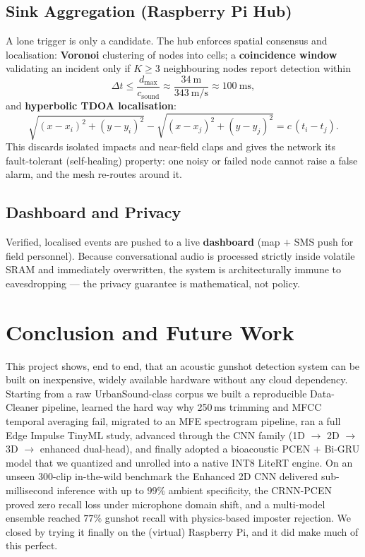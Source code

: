 \documentclass[conference]{IEEEtran}
\begin{document}
\subsection{Sink Aggregation (Raspberry Pi Hub)}
A lone trigger is only a candidate. The hub enforces spatial consensus and localisation:
\textbf{Voronoi} clustering of nodes into cells; a \textbf{coincidence window} validating an incident only if
$K \ge 3$ neighbouring nodes report detection within
\begin{equation}
    \Delta t \le \frac{d_{\max}}{c_{\text{sound}}} \approx \frac{34\ \text{m}}{343\ \text{m/s}} \approx 100\ \text{ms},
\end{equation}
and \textbf{hyperbolic TDOA localisation}:
\begin{equation}
    \sqrt{(x-x_i)^2+(y-y_i)^2} - \sqrt{(x-x_j)^2+(y-y_j)^2} = c\,(t_i-t_j).
\end{equation}
This discards isolated impacts and near-field claps and gives the network its fault-tolerant (self-healing)
property: one noisy or failed node cannot raise a false alarm, and the mesh re-routes around it.

\subsection{Dashboard and Privacy}
Verified, localised events are pushed to a live \textbf{dashboard} (map $+$ SMS push for field personnel).
Because conversational audio is processed strictly inside volatile SRAM and immediately overwritten, the
system is architecturally immune to eavesdropping --- the privacy guarantee is mathematical, not policy.

\section{Conclusion and Future Work}
\label{sec:conclusion}
This project shows, end to end, that an acoustic gunshot detection system can be built on inexpensive,
widely available hardware without any cloud dependency. Starting from a raw UrbanSound-class corpus we built
a reproducible Data-Cleaner pipeline, learned the hard way why 250\,ms trimming and MFCC temporal averaging
fail, migrated to an MFE spectrogram pipeline, ran a full Edge Impulse TinyML study, advanced through the CNN
family (1D $\rightarrow$ 2D $\rightarrow$ 3D $\rightarrow$ enhanced dual-head), and finally adopted a
bioacoustic PCEN $+$ Bi-GRU model that we quantized and unrolled into a native INT8 LiteRT engine. On an
unseen 300-clip in-the-wild benchmark the Enhanced 2D CNN delivered sub-millisecond inference with up to
$99\%$ ambient specificity, the CRNN-PCEN proved zero recall loss under microphone domain shift, and a
multi-model ensemble reached $77\%$ gunshot recall with physics-based imposter rejection. We closed by trying
it finally on the (virtual) Raspberry Pi, and it did make much of this perfect.
\end{document}
